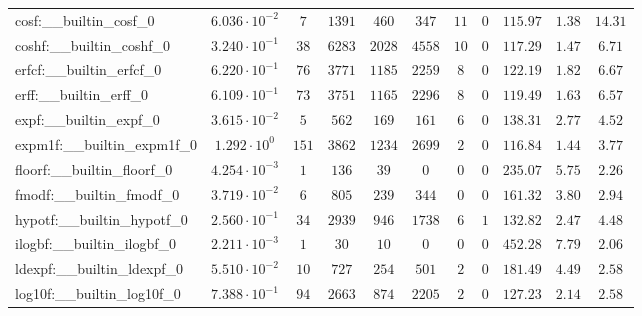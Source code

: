 \begin{tabular}{|l|c|c|c|c|c|c|c|c|c|c|}
cosf:\_\_builtin\_cosf\_0                 & $ 6.036 \cdot 10^{-2} $ & $ 7      $ & $ 1391   $ & $ 460   $ & $ 347   $ & $ 11  $ & $ 0 $ & $ 115.97      $ & $ 1.38    $ & $ 14.31   $ \\
coshf:\_\_builtin\_coshf\_0               & $ 3.240 \cdot 10^{-1} $ & $ 38     $ & $ 6283   $ & $ 2028  $ & $ 4558  $ & $ 10  $ & $ 0 $ & $ 117.29      $ & $ 1.47    $ & $ 6.71    $ \\
erfcf:\_\_builtin\_erfcf\_0               & $ 6.220 \cdot 10^{-1} $ & $ 76     $ & $ 3771   $ & $ 1185  $ & $ 2259  $ & $ 8   $ & $ 0 $ & $ 122.19      $ & $ 1.82    $ & $ 6.67    $ \\
erff:\_\_builtin\_erff\_0                 & $ 6.109 \cdot 10^{-1} $ & $ 73     $ & $ 3751   $ & $ 1165  $ & $ 2296  $ & $ 8   $ & $ 0 $ & $ 119.49      $ & $ 1.63    $ & $ 6.57    $ \\
expf:\_\_builtin\_expf\_0                 & $ 3.615 \cdot 10^{-2} $ & $ 5      $ & $ 562    $ & $ 169   $ & $ 161   $ & $ 6   $ & $ 0 $ & $ 138.31      $ & $ 2.77    $ & $ 4.52    $ \\
expm1f:\_\_builtin\_expm1f\_0             & $ 1.292 \cdot 10^{0}  $ & $ 151    $ & $ 3862   $ & $ 1234  $ & $ 2699  $ & $ 2   $ & $ 0 $ & $ 116.84      $ & $ 1.44    $ & $ 3.77    $ \\
floorf:\_\_builtin\_floorf\_0             & $ 4.254 \cdot 10^{-3} $ & $ 1      $ & $ 136    $ & $ 39    $ & $ 0     $ & $ 0   $ & $ 0 $ & $ 235.07      $ & $ 5.75    $ & $ 2.26    $ \\
fmodf:\_\_builtin\_fmodf\_0               & $ 3.719 \cdot 10^{-2} $ & $ 6      $ & $ 805    $ & $ 239   $ & $ 344   $ & $ 0   $ & $ 0 $ & $ 161.32      $ & $ 3.80    $ & $ 2.94    $ \\
hypotf:\_\_builtin\_hypotf\_0             & $ 2.560 \cdot 10^{-1} $ & $ 34     $ & $ 2939   $ & $ 946   $ & $ 1738  $ & $ 6   $ & $ 1 $ & $ 132.82      $ & $ 2.47    $ & $ 4.48    $ \\
ilogbf:\_\_builtin\_ilogbf\_0             & $ 2.211 \cdot 10^{-3} $ & $ 1      $ & $ 30     $ & $ 10    $ & $ 0     $ & $ 0   $ & $ 0 $ & $ 452.28      $ & $ 7.79    $ & $ 2.06    $ \\
ldexpf:\_\_builtin\_ldexpf\_0             & $ 5.510 \cdot 10^{-2} $ & $ 10     $ & $ 727    $ & $ 254   $ & $ 501   $ & $ 2   $ & $ 0 $ & $ 181.49      $ & $ 4.49    $ & $ 2.58    $ \\
log10f:\_\_builtin\_log10f\_0             & $ 7.388 \cdot 10^{-1} $ & $ 94     $ & $ 2663   $ & $ 874   $ & $ 2205  $ & $ 2   $ & $ 0 $ & $ 127.23      $ & $ 2.14    $ & $ 2.58    $ \\

\end{tabular}
